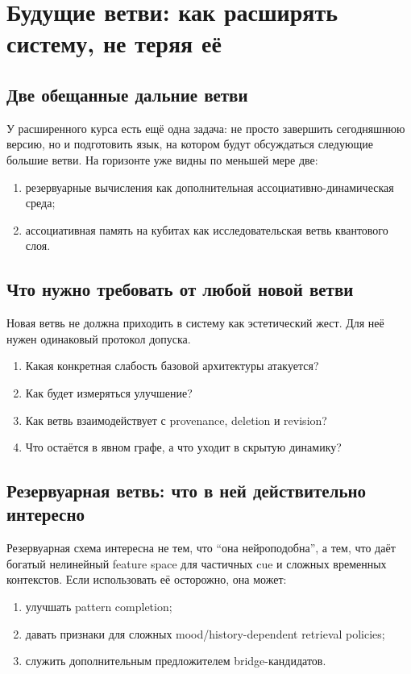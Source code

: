 \chapter{Будущие ветви: как расширять систему, не теряя её}

\section{Две обещанные дальние ветви}

У расширенного курса есть ещё одна задача: не просто завершить сегодняшнюю версию,
но и подготовить язык, на котором будут обсуждаться следующие большие ветви. На
горизонте уже видны по меньшей мере две:
\begin{enumerate}
\item резервуарные вычисления как дополнительная ассоциативно-динамическая среда;
\item ассоциативная память на кубитах как исследовательская ветвь квантового слоя.
\end{enumerate}

\section{Что нужно требовать от любой новой ветви}

Новая ветвь не должна приходить в систему как эстетический жест. Для неё нужен
одинаковый протокол допуска.
\begin{enumerate}
\item Какая конкретная слабость базовой архитектуры атакуется?
\item Как будет измеряться улучшение?
\item Как ветвь взаимодействует с provenance, deletion и revision?
\item Что остаётся в явном графе, а что уходит в скрытую динамику?
\end{enumerate}

\section{Резервуарная ветвь: что в ней действительно интересно}

Резервуарная схема интересна не тем, что ``она нейроподобна'', а тем, что даёт
богатый нелинейный feature space для частичных cue и сложных временных контекстов.
Если использовать её осторожно, она может:
\begin{enumerate}
\item улучшать pattern completion;
\item давать признаки для сложных mood/history-dependent retrieval policies;
\item служить дополнительным предложителем bridge-кандидатов.
\end{enumerate}

